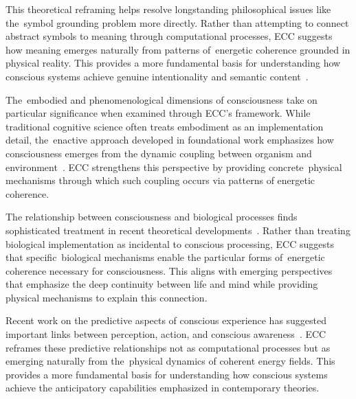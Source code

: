 \begin{refsection}
  This theoretical reframing helps resolve longstanding philosophical issues like the~symbol grounding problem more directly. Rather than attempting to connect abstract symbols to meaning through computational processes, ECC suggests how meaning emerges naturally from patterns of~energetic coherence grounded in physical reality. This provides a more fundamental basis for understanding how conscious systems achieve genuine intentionality and semantic content~\cite{Chalmers2018, harnad1990symbol}.

  The~embodied and phenomenological dimensions of consciousness take on particular significance when examined through ECC's framework. While traditional cognitive science often treats embodiment as an implementation detail, the~enactive approach developed in foundational work emphasizes how consciousness emerges from the dynamic coupling between organism and environment~\cite{Varela2017, Clark1997}. ECC strengthens this perspective by providing concrete~physical mechanisms through which such coupling occurs via patterns of energetic coherence.

  The relationship between consciousness and biological processes finds sophisticated treatment in recent theoretical developments~\cite{Thompson2018, lyon2021reframing}. Rather than treating biological implementation as incidental to conscious processing, ECC suggests that specific~biological mechanisms enable the particular forms of~energetic coherence necessary for consciousness. This aligns with emerging perspectives that emphasize the deep continuity between life and mind while providing physical mechanisms to explain this connection.

  Recent work on the predictive aspects of conscious experience has suggested important links between perception, action, and conscious awareness~\cite{Seth2021}. ECC reframes these predictive relationships not as computational processes but as emerging naturally from the~physical dynamics of coherent energy fields. This provides a more fundamental basis for understanding how conscious systems achieve the anticipatory capabilities emphasized in contemporary theories.


\end{refsection}
